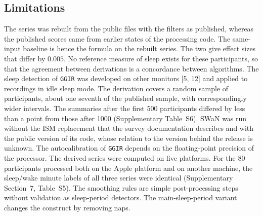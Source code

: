 \documentclass[12pt]{article}
\begin{document}
\subsection{Limitations}
The series was rebuilt from the public files with the filters as published,
whereas the published scores came from earlier states of the processing code. The same-input baseline is hence the formula on the rebuilt series. The two give effect sizes that differ by $0.005$. No reference measure of sleep
exists for these participants, so that the agreement between derivations is a
concordance between algorithms. The sleep
detection of \texttt{GGIR} was developed on other monitors [5, 12] and applied to recordings in idle sleep mode.
The derivation covers a random sample of \rawNsample{} participants, about one
seventh of the published sample, with correspondingly wider intervals. The summaries after the first 500 participants differed by less than a point from
those after 1000 (Supplementary Table~S6). SWaN was run without the ISM
replacement that the survey documentation describes and with the public
version of its code, whose relation to the version behind the release is
unknown. The autocalibration of \texttt{GGIR} depends on the floating-point precision of the processor. The derived series were computed on five platforms. For the 80 participants processed both on the Apple platform and on another machine, the sleep/wake minute labels of all three series were identical (Supplementary Section~7, Table~S5). The
smoothing rules are simple post-processing steps without validation as sleep-period detectors. The main-sleep-period variant changes the construct by removing naps.
\end{document}
